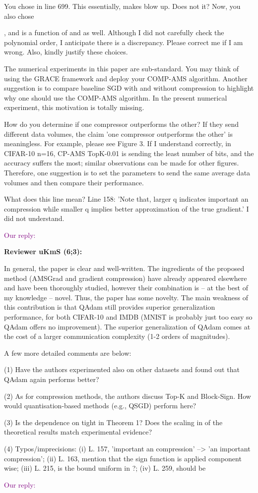 \documentclass{article}
\begin{document}
You chose  in line 699. This essentially, makes  blow up. Does not it? Now, you also chose 
 
, and  is a function of  and  as well. Although I did not carefully check the polynomial order, I anticipate there is a discrepancy. Please correct me if I am wrong. Also, kindly justify these choices.

The numerical experiments in this paper are sub-standard. You may think of using the GRACE framework and deploy your COMP-AMS algorithm. Another suggestion is to compare baseline SGD with and without compression to highlight why one should use the COMP-AMS algorithm. In the present numerical experiment, this motivation is totally missing.

How do you determine if one compressor outperforms the other? If they send different data volumes, the claim 'one compressor outperforms the other' is meaningless. For example, please see Figure 3. If I understand correctly, in CIFAR-10 n=16, CP-AMS TopK-0.01 is sending the least number of bits, and the accuracy suffers the most; similar observations can be made for other figures. Therefore, one suggestion is to set the parameters to send the same average data volumes and then compare their performance.

What does this line mean? Line 158: 'Note that, larger q indicates important an compression while smaller q implies better approximation of the true gradient.' I did not understand.


\textcolor{purple}{Our reply:}



\textbf{Reviewer uKmS (6;3):}


In general, the paper is clear and well-written. The ingredients of the proposed method (AMSGrad and gradient compression) have already appeared elsewhere and have been thoroughly studied, however their combination is -- at the best of my knowledge -- novel. Thus, the paper has some novelty. The main weakness of this contribution is that QAdam still provides superior generalization performance, for both CIFAR-10 and IMDB (MNIST is probably just too easy so QAdam offers no improvement). The superior generalization of QAdam comes at the cost of a larger communication complexity (1-2 orders of magnitudes).

A few more detailed comments are below:

(1) Have the authors experimented also on other datasets and found out that QAdam again performs better?

(2) As for compression methods, the authors discuss Top-K and Block-Sign. How would quantisation-based methods (e.g., QSGD) perform here?

(3) Is the dependence on  tight in Theorem 1? Does the scaling in  of the theoretical results match experimental evidence?

(4) Typos/imprecisions: (i) L. 157, 'important an compression' --> 'an important compression'; (ii) L. 163, mention that the sign function is applied component wise; (iii) L. 215, is the bound uniform in ?; (iv) L. 259,  should be 



\textcolor{purple}{Our reply:}
\end{document}
